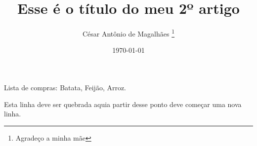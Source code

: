 \documentclass[12pt, a4paper]{article}
\title{Esse é o título do meu 2º artigo}
\author{César Antônio de Magalhães \thanks{Agradeço a minha mãe}}
\date{\today}
\begin{document}
\setlength{\parindent}{2cm}
\lipsum[1]

\noindent
\lipsum[2]

\newpage
\lipsum[3]

\vspace{2cm}
Lista de compras: Batata, \hspace{1cm}Feijão, \hspace{1cm}Arroz.

Esta linha deve ser quebrada aqui\hfill\break a partir desse ponto deve começar uma nova linha.
\end{document}
